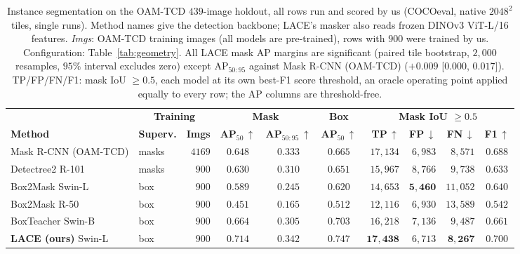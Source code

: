 \documentclass[remotesensing,article,submit,moreauthors]{Definitions/mdpi}
\begin{document}
\begin{table}[H]
\caption{Instance segmentation on the OAM-TCD $439$-image holdout, all rows run and scored by us (COCOeval, native $2048^2$ tiles, single runs). Method names give the detection backbone; LACE's masker also reads frozen DINOv3 ViT-L/16 features. \emph{Imgs}: OAM-TCD training images (all models are pre-trained), rows with $900$ were trained by us. Configuration: Table~\ref{tab:geometry}. All LACE mask AP margins are significant (paired tile bootstrap, $2{,}000$ resamples, $95\%$ interval excludes zero) except AP$_{50:95}$ against Mask R-CNN (OAM-TCD) ($+0.009$ [$0.000$, $0.017$]). TP/FP/FN/F1: mask IoU $\geq 0.5$, each model at its own best-F1 score threshold, an oracle operating point applied equally to every row; the AP columns are threshold-free.}
\label{tab:oamtcd439}
\setlength{\tabcolsep}{4pt}
\begin{tabularx}{\textwidth}{@{}>{\raggedright\arraybackslash}X l r c c c r r r c@{}}
\toprule
 & \multicolumn{2}{c}{\textbf{Training}} & \multicolumn{2}{c}{\textbf{Mask}} & \textbf{Box} & \multicolumn{4}{c}{\textbf{Mask IoU $\mathbf{\geq 0.5}$}} \\
\cmidrule(lr){2-3} \cmidrule(lr){4-5} \cmidrule(lr){6-6} \cmidrule(l){7-10}
\textbf{Method} & \textbf{Superv.} & \textbf{Imgs} &
\textbf{AP\boldmath$_{50}$}\,$\uparrow$ &
\textbf{AP\boldmath$_{50:95}$}\,$\uparrow$ &
\textbf{AP\boldmath$_{50}$}\,$\uparrow$ &
\textbf{TP}\,$\uparrow$ & \textbf{FP}\,$\downarrow$ & \textbf{FN}\,$\downarrow$ & \textbf{F1}\,$\uparrow$ \\
\midrule
Mask R-CNN (OAM-TCD) & masks & $4169$ & $0.648$ & $0.333$ & $0.665$ & $17{,}134$ & $6{,}983$ & $8{,}571$ & $0.688$ \\
Detectree2 R-101 & masks & $900$ & $0.630$ & $0.310$ & $0.651$ & $15{,}967$ & $8{,}766$ & $9{,}738$ & $0.633$ \\
\addlinespace[2pt]
Box2Mask Swin-L & box & $900$ & $0.589$ & $0.245$ & $0.620$ & $14{,}653$ & $\mathbf{5{,}460}$ & $11{,}052$ & $0.640$ \\
Box2Mask R-50 & box & $900$ & $0.451$ & $0.165$ & $0.512$ & $12{,}116$ & $6{,}930$ & $13{,}589$ & $0.542$ \\
BoxTeacher Swin-B & box & $900$ & $0.664$ & $0.305$ & $0.703$ & $16{,}218$ & $7{,}136$ & $9{,}487$ & $0.661$ \\
\addlinespace[2pt]
\textbf{LACE (ours)} Swin-L & box & $900$
  & $\mathbf{0.714}$ & $\mathbf{0.342}$ & $\mathbf{0.747}$ & $\mathbf{17{,}438}$ & $6{,}713$ & $\mathbf{8{,}267}$ & $\mathbf{0.700}$ \\
\bottomrule
\end{tabularx}
\end{table}
\end{document}
